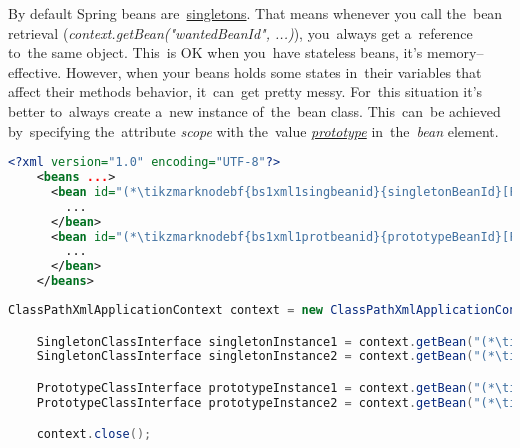 \label{beanscope}
By default Spring beans are~\hyperref[singletondp]{singletons}.
That means whenever you call the~bean retrieval (\textit{context.getBean("wantedBeanId", ...)}), you~always get a~reference to~the same object.
This~is OK when you~have stateless beans, it's memory--effective.
However, when your beans holds some states in~their variables that affect their methods behavior, it~can~get pretty messy.
For~this situation it's better to~always create a~new instance of~the~bean class.
This~can~be achieved by~specifying the~attribute \textit{scope} with the~value \hyperref[prototypedp]{\textit{prototype}} in~the~\textit{bean} element.

\example
\begin{lstlisting}[language=XML, title={Configuration XML}]
    <?xml version="1.0" encoding="UTF-8"?>
    <beans ...>
      <bean id="(*\tikzmarknodebf{bs1xml1singbeanid}{singletonBeanId}[ForestGreen]*)" class="somepackage.subpackage.SingletonClass">
        ...
      </bean>
      <bean id="(*\tikzmarknodebf{bs1xml1protbeanid}{prototypeBeanId}[ForestGreen]*)" class="somepackage.subpackage.PrototypeClass" scope="prototype">
        ...
      </bean>
    </beans>
\end{lstlisting}
\begin{lstlisting}[language=Java, title={Usage}]
    ClassPathXmlApplicationContext context = new ClassPathXmlApplicationContext("configurationFile.xml");

    SingletonClassInterface singletonInstance1 = context.getBean("(*\tikzmarknodebf{bs1java1singbeanid1}{singletonBeanId}[ForestGreen]*)", SingletonClassInterface.class);
    SingletonClassInterface singletonInstance2 = context.getBean("(*\tikzmarknodebf{bs1java1singbeanid2}{singletonBeanId}[ForestGreen]*)", SingletonClassInterface.class);

    PrototypeClassInterface prototypeInstance1 = context.getBean("(*\tikzmarknodebf{bs1java1protbeanid1}{prototypeBeanId}[ForestGreen]*)", PrototypeClassInterface.class);
    PrototypeClassInterface prototypeInstance2 = context.getBean("(*\tikzmarknodebf{bs1java1protbeanid2}{prototypeBeanId}[ForestGreen]*)", PrototypeClassInterface.class);

    context.close();
\end{lstlisting}

